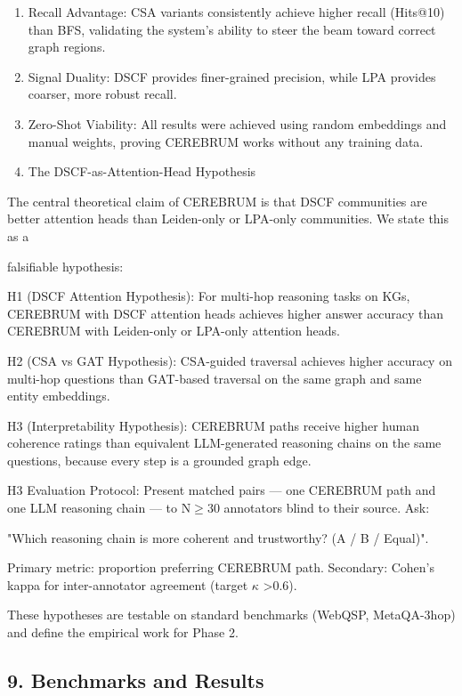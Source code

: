 \documentclass[10pt,journal,compsoc]{IEEEtran}
\begin{document}
\begin{enumerate}
\item Recall Advantage: CSA variants consi\-stently achieve higher recall (Hits@10) than BFS, validating the system's ability to steer the beam toward correct graph regions.
\item Signal Duality: DSCF provides finer-grained precision, while LPA provides coarser, more robust recall.
\item Zero-Shot Viability: All results were achieved using random embeddings and manual weights, proving CEREBRUM works without any training data.

\item The DSCF-as-Attention-Head Hypothesis

\end{enumerate}
The central theoretical claim of CEREBRUM is that DSCF communities are better attention heads than Leiden-only or LPA-only communities. We state this as a

falsifiable hypothesis:

H1 (DSCF Attention Hypothesis): For multi-hop reasoning tasks on KGs, CEREBRUM with DSCF attention heads achieves higher answer accuracy than CEREBRUM with Leiden-only or LPA-only attention heads.

H2 (CSA vs GAT Hypothesis): CSA-guided traversal achieves higher accuracy on multi-hop questions than GAT-based traversal on the same graph and same entity embeddings.

H3 (Interp\-retability Hypothesis): CEREBRUM paths receive higher human coherence ratings than equivalent LLM-generated reasoning chains on the same questions, because every step is a grounded graph edge.

H3 Evaluation Protocol: Present matched pairs — one CEREBRUM path and one LLM reasoning chain — to N$\ge$30 annotators blind to their source. Ask:

"Which reasoning chain is more coherent and trustworthy? (A / B / Equal)".

Primary metric: proportion preferring CEREBRUM path. Secondary: Cohen's kappa for inter-annotator agreement (target $\kappa$ \textgreater  0.6).

These hypotheses are testable on standard benchmarks (WebQSP, MetaQA-3hop) and define the empirical work for Phase 2.

\subsection{9. Benchmarks and Results}
\end{document}
